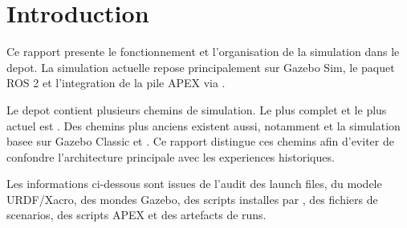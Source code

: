 \section{Introduction}

Ce rapport presente le fonctionnement et l'organisation de la simulation dans le depot. La simulation actuelle repose principalement sur Gazebo Sim, le paquet ROS 2  et l'integration de la pile APEX via .

Le depot contient plusieurs chemins de simulation. Le plus complet et le plus actuel est . Des chemins plus anciens existent aussi, notamment  et la simulation  basee sur Gazebo Classic et . Ce rapport distingue ces chemins afin d'eviter de confondre l'architecture principale avec les experiences historiques.

Les informations ci-dessous sont issues de l'audit des launch files, du modele URDF/Xacro, des mondes Gazebo, des scripts installes par , des fichiers de scenarios, des scripts APEX et des artefacts de runs.

